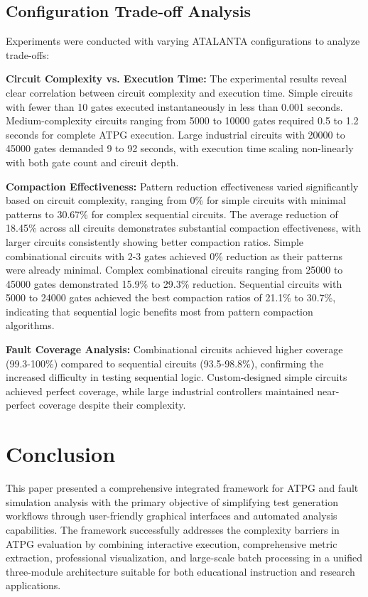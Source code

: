 \documentclass[conference]{IEEEtran}
\begin{document}
\subsection{Configuration Trade-off Analysis}

Experiments were conducted with varying ATALANTA configurations to analyze trade-offs:

\textbf{Circuit Complexity vs. Execution Time:} The experimental results reveal clear correlation between circuit complexity and execution time. Simple circuits with fewer than 10 gates executed instantaneously in less than 0.001 seconds. Medium-complexity circuits ranging from 5000 to 10000 gates required 0.5 to 1.2 seconds for complete ATPG execution. Large industrial circuits with 20000 to 45000 gates demanded 9 to 92 seconds, with execution time scaling non-linearly with both gate count and circuit depth.

\textbf{Compaction Effectiveness:} Pattern reduction effectiveness varied significantly based on circuit complexity, ranging from 0\% for simple circuits with minimal patterns to 30.67\% for complex sequential circuits. The average reduction of 18.45\% across all circuits demonstrates substantial compaction effectiveness, with larger circuits consistently showing better compaction ratios. Simple combinational circuits with 2-3 gates achieved 0\% reduction as their patterns were already minimal. Complex combinational circuits ranging from 25000 to 45000 gates demonstrated 15.9\% to 29.3\% reduction. Sequential circuits with 5000 to 24000 gates achieved the best compaction ratios of 21.1\% to 30.7\%, indicating that sequential logic benefits most from pattern compaction algorithms.

\textbf{Fault Coverage Analysis:}
Combinational circuits achieved higher coverage (99.3-100\%) compared to sequential circuits (93.5-98.8\%), confirming the increased difficulty in testing sequential logic. Custom-designed simple circuits achieved perfect coverage, while large industrial controllers maintained near-perfect coverage despite their complexity.

\section{Conclusion}

This paper presented a comprehensive integrated framework for ATPG and fault simulation analysis with the primary objective of simplifying test generation workflows through user-friendly graphical interfaces and automated analysis capabilities. The framework successfully addresses the complexity barriers in ATPG evaluation by combining interactive execution, comprehensive metric extraction, professional visualization, and large-scale batch processing in a unified three-module architecture suitable for both educational instruction and research applications.
\end{document}
